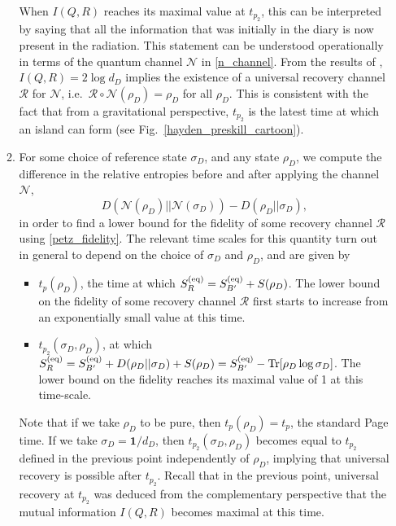 \documentclass[a4paper,11pt]{article}
\newcommand{\be}{\begin{equation}}
\newcommand{\ee}{\end{equation}}
\newcommand\sN{{\ensuremath{{\mathcal N}}}}
\newcommand\sR{{\mathcal R}}
\begin{document}
\begin{enumerate}
\begin{enumerate}
When $I(Q, R)$ reaches its maximal value at $t_{p_2}$, this can be interpreted by saying that all the information that was initially in the diary is now present in the radiation. This statement can be understood operationally in terms of the quantum channel $\sN$ in \eqref{n_channel}. From the results of \cite{2007PhRvA..75f4304N}, $I(Q, R)= 2 \log d_D$ implies the existence of a universal recovery channel $\sR$ for $\sN$, i.e.~$\sR \circ \sN (\rho_D) = \rho_D$ for all $\rho_D$. This is consistent with the fact that from a gravitational perspective, $t_{p_2}$ is the latest time at which an island can form \cite{2020JHEP...09..002P} (see Fig.~\ref{hayden_preskill_cartoon}). 
\item For some choice of reference state $\sigma_D$, and any state $\rho_D$, we compute the difference in the relative entropies before and after applying the channel $\sN$,
\be 
 D(\sN(\rho_D)|| \sN(\sigma_D))- D(\rho_D || \sigma_D), 
 \ee
in order to find a lower bound for the fidelity of some recovery channel $\sR$ using \eqref{petz_fidelity}. The relevant time scales for this quantity turn out in general to depend on the choice of $\sigma_D$ and $\rho_D$, and are given by 
\begin{itemize}
\item $t_p(\rho_D)$, the time at which $S^{\rm (eq)}_R = S^{\rm (eq)}_{B'} + S(\rho_D)$. The lower bound on the fidelity of some recovery channel $\sR$ first starts to increase from an exponentially small value at this time. 
\item $t_{p_2}(\sigma_D, \rho_D)$, at which $S^{\rm (eq)}_R = S^{\rm (eq)}_{B'} + D(\rho_D || \sigma_D) +S(\rho_D) = S^{\rm (eq)}_{B'} - \text{Tr}[\rho_D \log \sigma_D]$. The lower bound on the fidelity reaches its maximal value of 1 at this time-scale. 
\end{itemize} 
Note that if we take $\rho_D$ to be pure, then $t_p(\rho_D) = t_p$, the standard Page time. If we take $\sigma_D = \mathbf{1}/d_D$, then $t_{p_2}(\sigma_D, \rho_D)$ becomes equal to $t_{p_2}$ defined in the previous point independently of $\rho_D$, implying that universal recovery is possible after $t_{p_2}$. Recall that in the previous point, universal recovery at $t_{p_2}$ was deduced from the complementary perspective that the mutual information $I(Q, R)$ becomes maximal at this time. 



\end{enumerate}
\end{enumerate}
\end{document}
